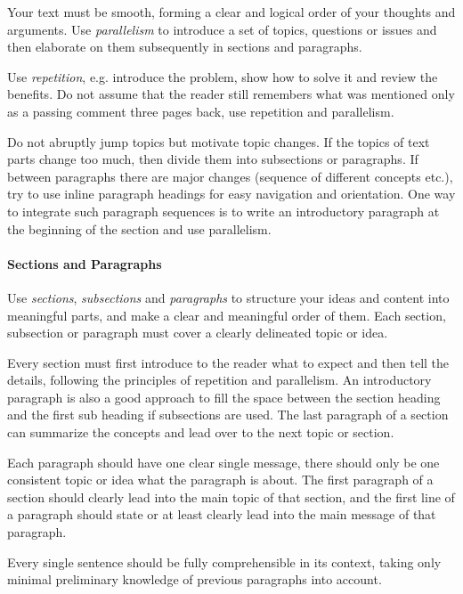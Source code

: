\documentclass[11pt, a4paper,oneside,chapterprefix=false]{scrbook}
\begin{document}
Your text must be smooth, forming a clear and logical order of your thoughts and arguments. Use \emph{parallelism} to introduce a set of topics, questions or issues and then elaborate on them subsequently in sections and paragraphs.

Use \emph{repetition}, e.g. introduce the problem, show how to solve it and review the benefits. Do not assume that the reader still remembers what was mentioned only as a passing comment three pages back, use repetition and parallelism.

Do not abruptly jump topics but motivate topic changes. If the topics of text parts change too much, then divide them into subsections or paragraphs. If between paragraphs there are major changes (sequence of different concepts etc.), try to use inline paragraph headings for easy navigation and orientation. One way to integrate such paragraph sequences is to write an introductory paragraph at the beginning of the section and use parallelism.

\paragraph*{Sections and Paragraphs}

Use \emph{sections}, \emph{subsections} and \emph{paragraphs} to structure your ideas and content into meaningful parts, and make a clear and meaningful order of them. Each section, subsection or paragraph must cover a clearly delineated topic or idea.

Every section must first introduce to the reader what to expect and then tell the details, following the principles of repetition and parallelism. An introductory paragraph is also a good approach to fill the space between the section heading and the first sub heading if subsections are used. The last paragraph of a section can summarize the concepts and lead over to the next topic or section.

Each paragraph should have one clear single message, there should only be one consistent topic or idea what the paragraph is about. The first paragraph of a section should clearly lead into the main topic of that section, and the first line of a paragraph should state or at least clearly lead into the main message of that paragraph.

Every single sentence should be fully comprehensible in its context, taking only minimal preliminary knowledge of previous paragraphs into account.
\end{document}
